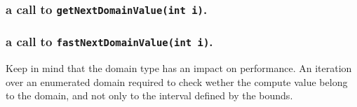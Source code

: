 \documentclass[11pt]{amsart}
\newcommand{\mylst}[1]{\lstinline|#1|}
\begin{document}
\subsubsection{a call to \mylst{getNextDomainValue(int i)}.}


\subsubsection{a call to \mylst{fastNextDomainValue(int i)}.}
 
  
Keep in mind that the domain type has an impact on performance. An iteration over an enumerated domain required to check wether the compute value belong to the domain, and not only to the interval defined by the bounds. 




\end{document}
